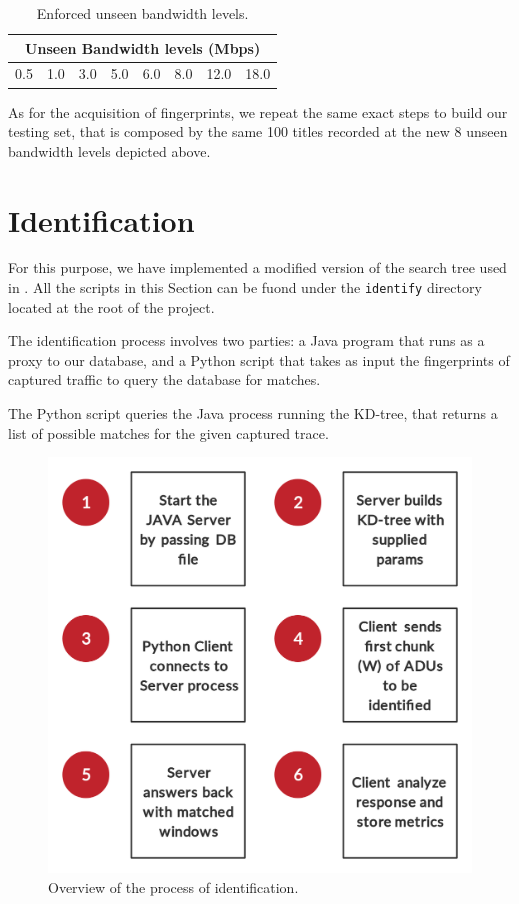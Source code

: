 \begin{table}[htb]
  \centering
  \begin{tabular}{|c|c|c|c|c|c|c|c|}
    \hline
    \multicolumn{8}{|c|}{\textbf{Unseen Bandwidth levels (Mbps)}} \\
    \hline
    0.5 & 1.0 & 3.0 & 5.0 & 6.0 & 8.0 & 12.0 & 18.0 \\
    \hline
  \end{tabular}
  \caption{Enforced unseen bandwidth levels.}
  \label{tab:unseen_bandwidths}
\end{table}

As for the acquisition of fingerprints, we repeat the same exact steps to build
our testing set, that is composed by the same 100 titles recorded at the new 8
unseen bandwidth levels depicted above. 

\newpage
\section{Identification}

For this purpose, we have implemented a modified version of the search tree
used in \cite{netflix-real-time}. All the scripts in this Section can be fuond
under the \texttt{identify} directory located at the root of the project.

The identification process involves two parties: a Java program that runs as
a proxy to our database, and a Python script that takes as input the
fingerprints of captured traffic to query the database for matches.

The Python script queries the Java process running the KD-tree, that returns a
list of possible matches for the given captured trace.

\begin{figure}[!h]
  \centering
  \includegraphics[width=.6\columnwidth]{img/identification.png}
  \caption{Overview of the process of identification.}
  \label{fig:identification}
\end{figure}

